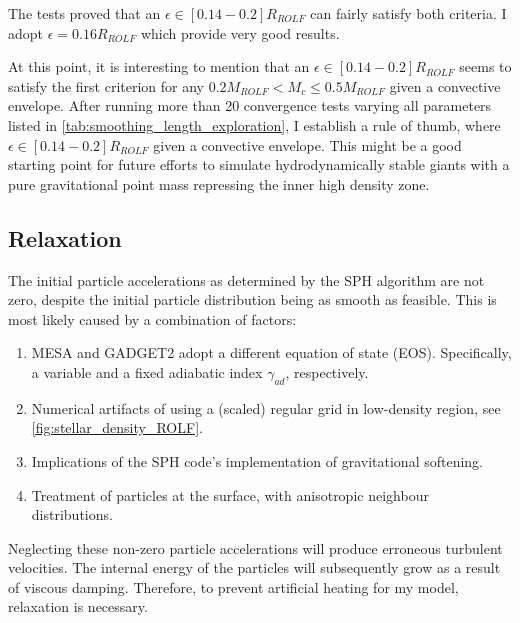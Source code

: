 The tests proved that an $\epsilon \in [0.14-0.2] R_{ROLF}$ can fairly satisfy both criteria. I adopt $\epsilon = 0.16 R_{ROLF}$ which provide very good results.

At this point, it is interesting to mention that an $\epsilon \in [0.14-0.2] R_{ROLF}$ seems to satisfy the first criterion for any $0.2M_{ROLF} < M_c \leq 0.5M_{ROLF}$ given a convective envelope. After running more than 20 convergence tests varying all parameters listed in \cref{tab:smoothing_length_exploration}, I establish a rule of thumb, where $\epsilon \in [0.14-0.2] R_{ROLF}$ given a convective envelope. This might be a good starting point for future efforts to simulate hydrodynamically stable giants with a pure gravitational point mass repressing the inner high density zone.


\subsection{Relaxation}

The initial particle accelerations as determined by the SPH algorithm are not zero, despite the initial particle distribution being as smooth as feasible. This is most likely caused by a combination of factors:
\begin{enumerate}
    \item MESA and GADGET2 adopt a different equation of state (EOS). Specifically, a variable and a fixed adiabatic index $\gamma_{ad}$, respectively.
    \item Numerical artifacts of using a (scaled) regular grid in low-density region, see \cref{fig:stellar_density_ROLF}.
    \item Implications of the SPH code's implementation of gravitational softening.
    \item Treatment of particles at the surface, with anisotropic neighbour distributions.
\end{enumerate}
Neglecting these non-zero particle accelerations will produce erroneous turbulent velocities. The internal energy of the particles will subsequently grow as a result of viscous damping. Therefore, to prevent artificial heating for my model, relaxation is necessary.

